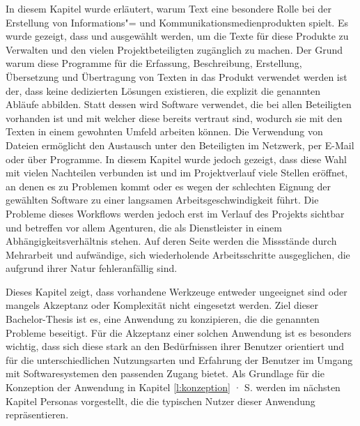 In diesem Kapitel wurde erläutert, warum Text eine besondere Rolle bei der Erstellung von Informations"= und Kommunikationsmedienprodukten spielt. Es wurde gezeigt, dass  und  ausgewählt werden, um die Texte für diese Produkte zu Verwalten und den vielen Projektbeteiligten zugänglich zu machen. Der Grund warum diese Programme für die Erfassung, Beschreibung, Erstellung, Übersetzung und Übertragung von Texten in das Produkt verwendet werden ist der, dass keine dedizierten Lösungen existieren, die explizit die genannten Abläufe abbilden. Statt dessen wird Software verwendet, die bei allen Beteiligten vorhanden ist und mit welcher diese bereits vertraut sind, wodurch sie mit den Texten in einem gewohnten Umfeld arbeiten können. Die Verwendung von Dateien ermöglicht den Austausch unter den Beteiligten im Netzwerk, per E-Mail oder über Programme. In diesem Kapitel wurde jedoch gezeigt, dass diese Wahl mit vielen Nachteilen verbunden ist und im Projektverlauf viele Stellen eröffnet, an denen es zu Problemen kommt oder es wegen der schlechten Eignung der gewählten Software zu einer langsamen Arbeitsgeschwindigkeit führt. Die Probleme dieses Workflows werden jedoch erst im Verlauf des Projekts sichtbar und betreffen vor allem Agenturen, die als Dienstleister in einem Abhängigkeitsverhältnis stehen. Auf deren Seite werden die Missstände durch Mehrarbeit und aufwändige, sich wiederholende Arbeitsschritte ausgeglichen, die aufgrund ihrer Natur fehleranfällig sind.

\secbar

Dieses Kapitel zeigt, dass vorhandene Werkzeuge entweder ungeeignet sind oder mangels Akzeptanz oder Komplexität nicht eingesetzt werden. Ziel dieser Bachelor-Thesis ist es, eine Anwendung zu konzipieren, die die genannten Probleme beseitigt. Für die Akzeptanz einer solchen Anwendung ist es besonders wichtig, dass sich diese stark an den Bedürfnissen ihrer Benutzer orientiert und für die unterschiedlichen Nutzungsarten und Erfahrung der Benutzer im Umgang mit Softwaresystemen den passenden Zugang bietet. Als Grundlage für die Konzeption der Anwendung in Kapitel \ref{l:konzeption} · S.\pageref{l:konzeption} werden im nächsten Kapitel Personas vorgestellt, die die typischen Nutzer dieser Anwendung repräsentieren.

\pagebreak